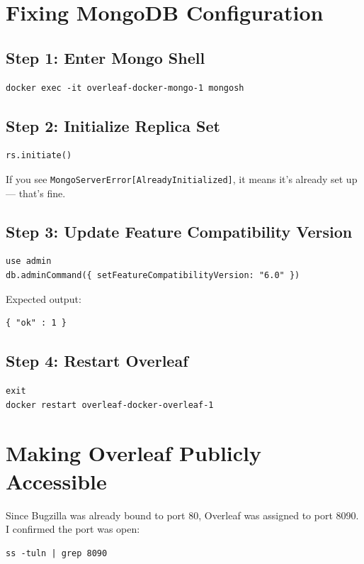 \section{Fixing MongoDB Configuration}

\subsection{Step 1: Enter Mongo Shell}
\begin{verbatim}
docker exec -it overleaf-docker-mongo-1 mongosh
\end{verbatim}

\subsection{Step 2: Initialize Replica Set}
\begin{verbatim}
rs.initiate()
\end{verbatim}

If you see \texttt{MongoServerError[AlreadyInitialized]}, it means it’s already set up — that’s fine.

\subsection{Step 3: Update Feature Compatibility Version}
\begin{verbatim}
use admin
db.adminCommand({ setFeatureCompatibilityVersion: "6.0" })
\end{verbatim}

Expected output:
\begin{verbatim}
{ "ok" : 1 }
\end{verbatim}

\subsection{Step 4: Restart Overleaf}
\begin{verbatim}
exit
docker restart overleaf-docker-overleaf-1
\end{verbatim}


\section{Making Overleaf Publicly Accessible}

Since Bugzilla was already bound to port 80, Overleaf was assigned to port 8090.  
I confirmed the port was open:
\begin{verbatim}
ss -tuln | grep 8090
\end{verbatim}

